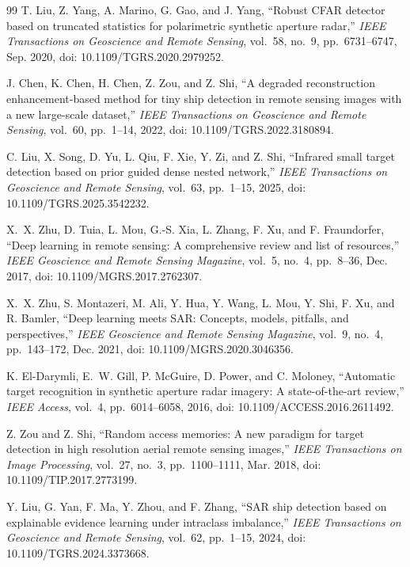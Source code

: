 \documentclass[journal]{IEEEtran}
\begin{document}
\begin{thebibliography}{99}
T. Liu, Z. Yang, A. Marino, G. Gao, and J. Yang, ``Robust CFAR detector based on truncated statistics for polarimetric synthetic aperture radar,'' \emph{IEEE Transactions on Geoscience and Remote Sensing}, vol.~58, no.~9, pp.~6731--6747, Sep. 2020, doi: 10.1109/TGRS.2020.2979252.

J. Chen, K. Chen, H. Chen, Z. Zou, and Z. Shi, ``A degraded reconstruction enhancement-based method for tiny ship detection in remote sensing images with a new large-scale dataset,'' \emph{IEEE Transactions on Geoscience and Remote Sensing}, vol.~60, pp.~1--14, 2022, doi: 10.1109/TGRS.2022.3180894.

C. Liu, X. Song, D. Yu, L. Qiu, F. Xie, Y. Zi, and Z. Shi, ``Infrared small target detection based on prior guided dense nested network,'' \emph{IEEE Transactions on Geoscience and Remote Sensing}, vol.~63, pp.~1--15, 2025, doi: 10.1109/TGRS.2025.3542232.

X.~X. Zhu, D. Tuia, L. Mou, G.-S. Xia, L. Zhang, F. Xu, and F. Fraundorfer, ``Deep learning in remote sensing: A comprehensive review and list of resources,'' \emph{IEEE Geoscience and Remote Sensing Magazine}, vol.~5, no.~4, pp.~8--36, Dec. 2017, doi: 10.1109/MGRS.2017.2762307.

X.~X. Zhu, S. Montazeri, M. Ali, Y. Hua, Y. Wang, L. Mou, Y. Shi, F. Xu, and R. Bamler, ``Deep learning meets SAR: Concepts, models, pitfalls, and perspectives,'' \emph{IEEE Geoscience and Remote Sensing Magazine}, vol.~9, no.~4, pp.~143--172, Dec. 2021, doi: 10.1109/MGRS.2020.3046356.

K. El-Darymli, E.~W. Gill, P. McGuire, D. Power, and C. Moloney, ``Automatic target recognition in synthetic aperture radar imagery: A state-of-the-art review,'' \emph{IEEE Access}, vol.~4, pp.~6014--6058, 2016, doi: 10.1109/ACCESS.2016.2611492.

Z. Zou and Z. Shi, ``Random access memories: A new paradigm for target detection in high resolution aerial remote sensing images,'' \emph{IEEE Transactions on Image Processing}, vol.~27, no.~3, pp.~1100--1111, Mar. 2018, doi: 10.1109/TIP.2017.2773199.

Y. Liu, G. Yan, F. Ma, Y. Zhou, and F. Zhang, ``SAR ship detection based on explainable evidence learning under intraclass imbalance,'' \emph{IEEE Transactions on Geoscience and Remote Sensing}, vol.~62, pp.~1--15, 2024, doi: 10.1109/TGRS.2024.3373668.


\end{thebibliography}
\end{document}
